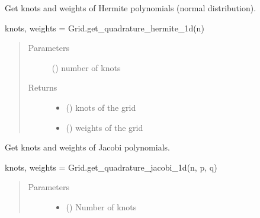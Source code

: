 \documentclass[letterpaper,10pt,english,openany,oneside]{sphinxmanual}
\begin{document}
\begin{fulllineitems}
\begin{fulllineitems}
\end{fulllineitems}


\begin{fulllineitems}
\label{\detokenize{pygpc:pygpc.Grid.Grid.get_quadrature_hermite_1d}}
Get knots and weights of Hermite polynomials (normal distribution).

knots, weights = Grid.get\_quadrature\_hermite\_1d(n)
\begin{quote}\begin{description}
\item[{Parameters}] \leavevmode
{} () \textendash{} number of knots

\item[{Returns}] \leavevmode
\begin{itemize}
\item {} 
 () \textendash{} knots of the grid

\item {} 
 () \textendash{} weights of the grid

\end{itemize}


\end{description}\end{quote}

\end{fulllineitems}


\begin{fulllineitems}
\label{\detokenize{pygpc:pygpc.Grid.Grid.get_quadrature_jacobi_1d}}
Get knots and weights of Jacobi polynomials.

knots, weights = Grid.get\_quadrature\_jacobi\_1d(n, p, q)
\begin{quote}\begin{description}
\item[{Parameters}] \leavevmode\begin{itemize}
\item {} 
 () \textendash{} Number of knots


\end{itemize}
\end{description}
\end{quote}
\end{fulllineitems}
\end{fulllineitems}
\end{document}
